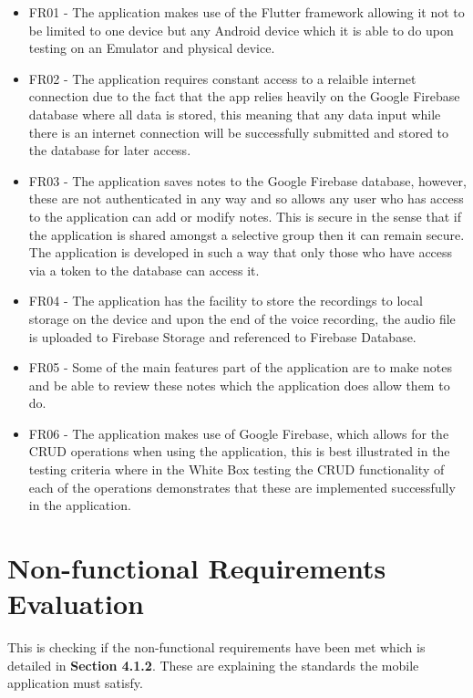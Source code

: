 \documentclass[oneside]{report}
\begin{document}
	\begin{itemize}
		\item FR01 - The application makes use of the Flutter framework allowing it not to be limited to one device but any Android device which it is able to do upon testing on an Emulator and physical device.
		\item FR02 - The application requires constant access to a relaible internet connection due to the fact that the app relies heavily on the Google Firebase database where all data is stored, this meaning that any data input while there is an internet connection will be successfully submitted and stored to the database for later access.
		\item FR03 - The application saves notes to the Google Firebase database, however, these are not authenticated in any way and so allows any user who has access to the application can add or modify notes. This is secure in the sense that if the application is shared amongst a selective group then it can remain secure. The application is developed in such a way that only those who have access via a token to the database can access it.
		\item FR04 - The application has the facility to store the recordings to local storage on the device and upon the end of the voice recording, the audio file is uploaded to Firebase Storage and referenced to Firebase Database.
		\item FR05 - Some of the main features part of the application are to make notes and be able to review these notes which the application does allow them to do.
		\item FR06 - The application makes use of Google Firebase, which allows for the CRUD operations when using the application, this is best illustrated in the testing criteria where in the White Box testing the CRUD functionality of each of the operations demonstrates that these are implemented successfully in the application.
	\end{itemize}

	\section{Non-functional Requirements Evaluation}
	This is checking if the non-functional requirements have been met which is detailed in \textbf{Section 4.1.2}. These are explaining the standards the mobile application must satisfy.
\end{document}

